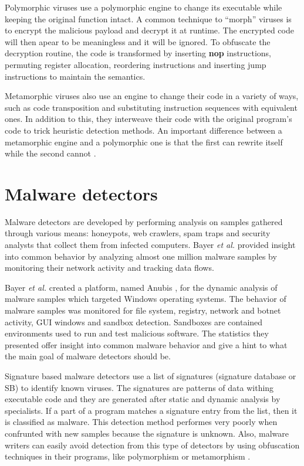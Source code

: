 Polymorphic viruses use a polymorphic engine to change its executable while keeping the original function intact. A common technique to ``morph'' viruses is to encrypt the malicious payload and decrypt it at runtime. The encrypted code will then apear to be meaningless and it will be ignored. To obfuscate the decryption routine, the code is transformed by inserting \textbf{nop} instructions, permuting register allocation, reordering instructions and inserting jump instructions to maintain the semantics.

Metamorphic viruses also use an engine to change their code in a variety of ways, such as code transposition and substituting instruction sequences with equivalent ones. In addition to this, they interweave their code with the original program's code to trick heuristic detection methods. An important difference between a metamorphic engine and a polymorphic one is that the first can rewrite itself while the second cannot \cite{testing-mal-det}.

\section{Malware detectors}
\label{sec:mal-detectors}

Malware detectors are developed by performing analysis on samples gathered through various means: honeypots, web crawlers, spam traps and security analysts that collect them from infected computers. Bayer \textit{et al.} \cite{current-mal-behavior} provided insight into common behavior by analyzing almost one million malware samples by monitoring their network activity and tracking data flows.

Bayer \textit{et al.} created a platform, named Anubis \cite{anubis-platform}, for the dynamic analysis of malware samples which targeted Windows operating systems. The behavior of malware samples was monitored for file system, registry, network and botnet activity, GUI windows and sandbox detection. Sandboxes are contained environments used to run and test malicious software. The statistics they presented offer insight into common malware behavior and give a hint to what the main goal of malware detectors should be.

Signature based malware detectors use a list of signatures (signature database or SB) to identify known viruses. The signatures are patterns of data withing executable code and they are generated after static and dynamic analysis by specialists. If a part of a program matches a signature entry from the list, then it is classified as malware. This detection method performes very poorly when confrunted with new samples because the signature is unknown. Also, malware writers can easily avoid detection from this type of detectors by using obfuscation techniques in their programs, like polymorphism or metamorphism \cite{mining-specifications}. 

